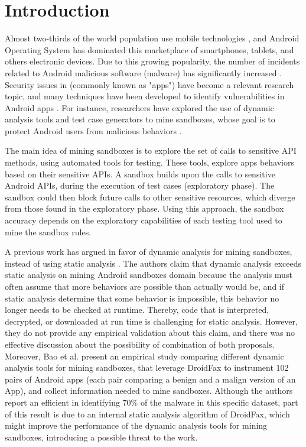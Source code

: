 \section{Introduction}

Almost two-thirds of the world population use mobile technologies \cite{Comscore}, and Android Operating System has dominated this marketplace of smartphones, tablets, and others electronic devices. Due to this growing popularity, the number of incidents related to Android malicious software (malware) has significantly increased \cite{faruki2014android,tan2015securing}. Security issues in (commonly known as "apps") have become a relevant research topic, and many techniques have been developed to identify vulnerabilities in Android apps \cite{tan2015securing}. For instance, researchers have explored the use of dynamic analysis tools and test case generators to mine sandboxes, whose goal is to protect Android users from malicious behaviors \cite{jamrozik2016mining}.

The main idea of mining sandboxes is to explore the set of calls to sensitive API methods, using automated tools for testing. These tools, explore apps behaviors based on their sensitive APIs. A sandbox builds upon the calls to sensitive Android APIs, during the execution of test cases (exploratory phase). The sandbox could then block future calls to other sensitive resources, which diverge from those found in the exploratory phase. Using this approach, the sandbox accuracy depends on the exploratory capabilities of each testing tool used to mine the sandbox rules.

A previous work has argued in favor of dynamic analysis for mining sandboxes, instead of using static analysis \cite{jamrozik2016mining}. The authors claim that dynamic analysis exceeds static analysis on mining Android sandboxes domain because the analysis must often assume that more behaviors are possible than actually would be, and if static analysis determine that some behavior is impossible, this behavior no longer needs to be checked at runtime. Thereby, code that is interpreted, decrypted, or downloaded at run time is challenging for static analysis. However, they do not provide any empirical validation about this claim, and there was no effective discussion about the possibility of combination of both proposals. Moreover, Bao et al. \cite{bao2018mining} present an empirical study comparing different dynamic analysis tools for mining sandboxes, that leverage DroidFax \cite{cai2017droidfax} to instrument 102 pairs of Android apps (each pair comparing a benign and a malign version of an App), and collect information needed to mine sandboxes. Although the authors report an efficient in identifying 70\% of the malware in this specific dataset, part of this result is due to an internal static analysis algorithm of DroidFax, which might improve the performance of the dynamic analysis tools for mining sandboxes, introducing a possible threat to the work.

